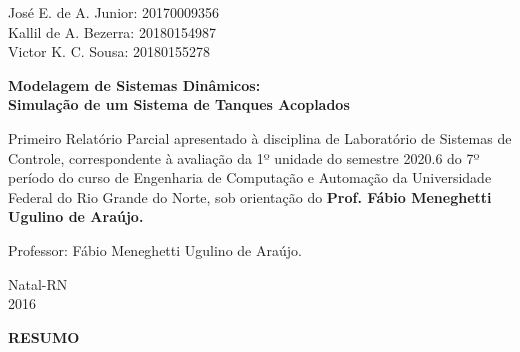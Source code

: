 \documentclass[a4paper,12pt]{article}
\begin{document}
\newpage


\thispagestyle{empty}

\begin{center}
\begin{normalsize}
José E. de A. Junior: 20170009356\\
\vspace{0.8cm}
Kallil de A. Bezerra: 20180154987\\
\vspace{0.8cm}
Victor K. C. Sousa: 20180155278\\
\end{normalsize}
\end{center}
\vspace{3cm}

{\bf{\large {\centering Modelagem de Sistemas Dinâmicos: \\ 
			Simulação de um Sistema de Tanques Acoplados\\}}}
\vspace{4cm}

\begin{adjustwidth}{7.5cm}{0cm}

{\normalsize

Primeiro Relatório Parcial apresentado à disciplina de
Laboratório de Sistemas de Controle, correspondente à
avaliação da 1º unidade do semestre 2020.6 do 7º período
do curso de Engenharia de Computação e Automação da
Universidade Federal do Rio Grande do Norte, sob
orientação do {\bf Prof. Fábio Meneghetti Ugulino de
Araújo.}

}

\end{adjustwidth}

\vspace{2cm}

\begin{center}

Professor:  Fábio Meneghetti Ugulino de Araújo.

\vspace{2.5cm}

{\large Natal-RN\\
2016}

\end{center}

\newpage


\thispagestyle{empty}

\begin{center}
{\large \textbf{RESUMO}}
\end{center}
\end{document}
